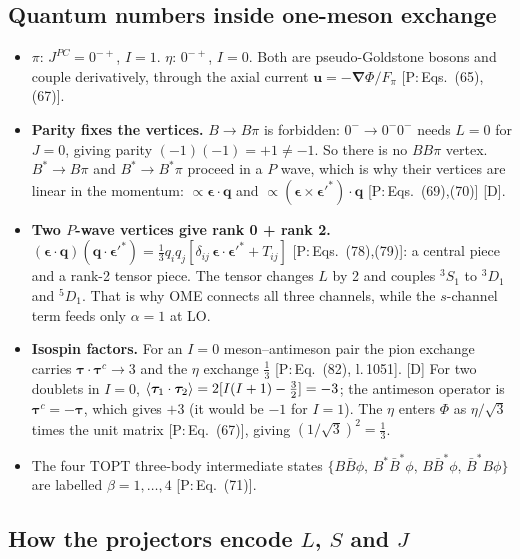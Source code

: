 \documentclass[11pt,a4paper]{article}
\newcommand{\tagP}[1]{\textcolor{blue!65!black}{\textsf{\small[P:\,#1]}}}
\newcommand{\tagD}{\textcolor{orange!85!black}{\textsf{\small[D]}}}
\begin{document}
\subsection{Quantum numbers inside one-meson exchange}
\label{sec:qn-ome}

\begin{itemize}
\item $\pi$: $J^{PC}=0^{-+}$, $I=1$. $\eta$: $0^{-+}$, $I=0$. Both are pseudo-Goldstone bosons and couple derivatively, through the axial current $\bm u=-\bm\nabla\Phi/F_\pi$ \tagP{Eqs.~(65),(67)}.
\item \textbf{Parity fixes the vertices.} $B\to B\pi$ is forbidden: $0^-\to0^-0^-$ needs $L=0$ for $J=0$, giving parity $(-1)(-1)=+1\neq-1$. So there is no $BB\pi$ vertex. $B^*\to B\pi$ and $B^*\to B^*\pi$ proceed in a $P$ wave, which is why their vertices are linear in the momentum: $\propto\bm\epsilon\cdot\bm q$ and $\propto(\bm\epsilon\times\bm\epsilon'^*)\cdot\bm q$ \tagP{Eqs.~(69),(70)} \tagD.
\item \textbf{Two $P$-wave vertices give rank 0 + rank 2.} $(\bm\epsilon\cdot\bm q)(\bm q\cdot\bm\epsilon'^*)=\frac13q_iq_j[\delta_{ij}\,\bm\epsilon\cdot\bm\epsilon'^*+T_{ij}]$ \tagP{Eqs.~(78),(79)}: a central piece and a rank-2 tensor piece. The tensor changes $L$ by 2 and couples $^3S_1$ to $^3D_1$ and $^5D_1$. That is why OME connects all three channels, while the $s$-channel term feeds only $\alpha=1$ at LO.
\item \textbf{Isospin factors.} For an $I=0$ meson--antimeson pair the pion exchange carries $\bm\tau\cdot\bm\tau^c\to3$ and the $\eta$ exchange $\frac13$ \tagP{Eq.~(82), l.\,1051}. \tagD{} For two doublets in $I=0$, $\braket{\bm\tau_1\cdot\bm\tau_2}=2[I(I+1)-\frac32]=-3$; the antimeson operator is $\bm\tau^c=-\bm\tau$, which gives $+3$ (it would be $-1$ for $I=1$). The $\eta$ enters $\Phi$ as $\eta/\sqrt3$ times the unit matrix \tagP{Eq.~(67)}, giving $(1/\sqrt3)^2=\frac13$.
\item The four TOPT three-body intermediate states $\{B\bar B\phi,\,B^*\bar B^*\phi,\,B\bar B^*\phi,\,\bar B^*B\phi\}$ are labelled $\beta=1,\dots,4$ \tagP{Eq.~(71)}.
\end{itemize}

\subsection{How the projectors encode $L$, $S$ and $J$}
\label{sec:qn-proj}
\end{document}
